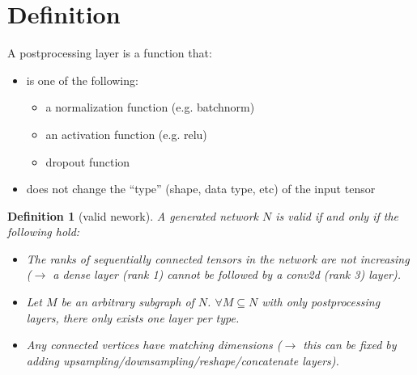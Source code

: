 \documentclass[12pt]{article}
\newtheorem{definition}{Definition}
\begin{document}
\maketitle


\section{Definition}

A postprocessing layer is a function that:
\begin{itemize}
\item is one of the following:
  \begin{itemize}
  \item a normalization function (e.g. batchnorm)
  \item an activation function (e.g. relu)
  \item dropout function
  \end{itemize}
\item does not change the ``type'' (shape, data type, etc) of the input tensor
\end{itemize}

\begin{definition}[valid nework]
  A generated network $N$ is valid if and only if the following hold:
  \begin{itemize}
    \item The ranks of sequentially connected tensors in the network are not increasing ($\rightarrow$ a dense layer (rank 1) cannot be followed by a conv2d (rank 3) layer).
  \item Let $M$ be an arbitrary subgraph of $N$. $\forall M\subseteq N$ with only postprocessing layers, there only exists one layer per type.
  \item Any connected vertices have matching dimensions ($\rightarrow$ this can be fixed by adding upsampling/downsampling/reshape/concatenate layers).
    \end{itemize}
  \end{definition}



\end{document}
